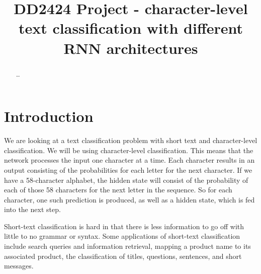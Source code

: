 \documentclass[runningheads]{llncs}
\begin{document}
\pagestyle{headings}
\mainmatter
\def\ECCV16SubNumber{***}
\title{DD2424 Project - character-level text classification with different RNN architectures}

\maketitle


\begin{abstract}

\dots
{}
\end{abstract}


\section{Introduction}


We are looking at a text classification problem with short text and character-level classification. We will be using character-level classification. This means that the network processes the input one character at a time. Each character results in an output consisting of the probabilities for each letter for the next character. If we have a 58-character alphabet, the hidden state will consist of the probability of each of those 58 characters for the next letter in the sequence. So for each character, one such prediction is produced, as well as a hidden state, which is fed into the next step.

Short-text classification is hard in that there is less information to go off with little to no grammar or syntax. Some applications of short-text classification include search queries and information retrieval, mapping a product name to its associated product, the classification of titles, questions, sentences, and short messages.
\end{document}
